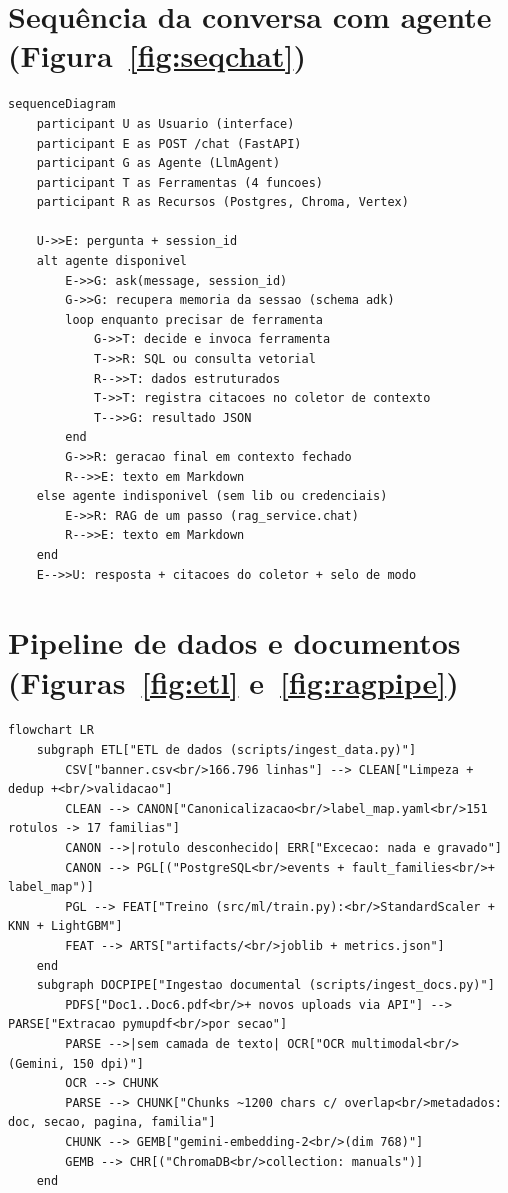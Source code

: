\section{Sequência da conversa com agente (Figura~\ref{fig:seqchat})}

\begin{lstlisting}[language=mermaid, caption={Sequência da conversa com o agente}, label={lst:mmseqchat}]
sequenceDiagram
    participant U as Usuario (interface)
    participant E as POST /chat (FastAPI)
    participant G as Agente (LlmAgent)
    participant T as Ferramentas (4 funcoes)
    participant R as Recursos (Postgres, Chroma, Vertex)

    U->>E: pergunta + session_id
    alt agente disponivel
        E->>G: ask(message, session_id)
        G->>G: recupera memoria da sessao (schema adk)
        loop enquanto precisar de ferramenta
            G->>T: decide e invoca ferramenta
            T->>R: SQL ou consulta vetorial
            R-->>T: dados estruturados
            T->>T: registra citacoes no coletor de contexto
            T-->>G: resultado JSON
        end
        G->>R: geracao final em contexto fechado
        R-->>E: texto em Markdown
    else agente indisponivel (sem lib ou credenciais)
        E->>R: RAG de um passo (rag_service.chat)
        R-->>E: texto em Markdown
    end
    E-->>U: resposta + citacoes do coletor + selo de modo
\end{lstlisting}

\section{Pipeline de dados e documentos (Figuras~\ref{fig:etl} e~\ref{fig:ragpipe})}

\begin{lstlisting}[language=mermaid, caption={Pipeline de dados e pipeline documental}, label={lst:mmpipe}]
flowchart LR
    subgraph ETL["ETL de dados (scripts/ingest_data.py)"]
        CSV["banner.csv<br/>166.796 linhas"] --> CLEAN["Limpeza + dedup +<br/>validacao"]
        CLEAN --> CANON["Canonicalizacao<br/>label_map.yaml<br/>151 rotulos -> 17 familias"]
        CANON -->|rotulo desconhecido| ERR["Excecao: nada e gravado"]
        CANON --> PGL[("PostgreSQL<br/>events + fault_families<br/>+ label_map")]
        PGL --> FEAT["Treino (src/ml/train.py):<br/>StandardScaler + KNN + LightGBM"]
        FEAT --> ARTS["artifacts/<br/>joblib + metrics.json"]
    end
    subgraph DOCPIPE["Ingestao documental (scripts/ingest_docs.py)"]
        PDFS["Doc1..Doc6.pdf<br/>+ novos uploads via API"] --> PARSE["Extracao pymupdf<br/>por secao"]
        PARSE -->|sem camada de texto| OCR["OCR multimodal<br/>(Gemini, 150 dpi)"]
        OCR --> CHUNK
        PARSE --> CHUNK["Chunks ~1200 chars c/ overlap<br/>metadados: doc, secao, pagina, familia"]
        CHUNK --> GEMB["gemini-embedding-2<br/>(dim 768)"]
        GEMB --> CHR[("ChromaDB<br/>collection: manuals")]
    end
\end{lstlisting}


